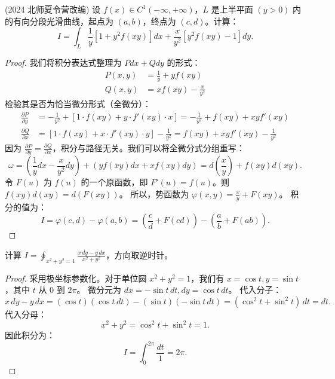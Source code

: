 \documentclass[lang=cn,10pt,thmcnt=section]{elegantbook}
\begin{document}
\begin{example}
    (2024 北师夏令营改编) 设 $f(x) \in C^1(-\infty, +\infty)$，$L$ 是上半平面 $(y > 0)$ 内的有向分段光滑曲线，起点为 $(a, b)$，终点为 $(c, d)$。计算：
\[
I = \int_{L} \frac{1}{y} [1 + y^2 f(xy)] dx + \frac{x}{y^2} [y^2 f(xy) - 1] dy.
\]
\end{example}
\begin{proof}
    我们将积分表达式整理为 $Pdx + Qdy$ 的形式：
    \begin{align*}
    P(x,y) &= \frac{1}{y} + y f(xy) \\
    Q(x,y) &= x f(xy) - \frac{x}{y^2}
    \end{align*}
    检验其是否为恰当微分形式（全微分）：
    \begin{align*}
    \frac{\partial P}{\partial y} &= -\frac{1}{y^2} + [1 \cdot f(xy) + y \cdot f'(xy) \cdot x] = -\frac{1}{y^2} + f(xy) + xy f'(xy) \\
    \frac{\partial Q}{\partial x} &= [1 \cdot f(xy) + x \cdot f'(xy) \cdot y] - \frac{1}{y^2} = f(xy) + xy f'(xy) - \frac{1}{y^2}
    \end{align*}
    因为 $\frac{\partial P}{\partial y} = \frac{\partial Q}{\partial x}$，积分与路径无关。我们可以将全微分式分组重写：
    \[
    \omega = \left( \frac{1}{y} dx - \frac{x}{y^2} dy \right) + \left( y f(xy) dx + x f(xy) dy \right) = d\left(\frac{x}{y}\right) + f(xy) d(xy).
    \]
    令 $F(u)$ 为 $f(u)$ 的一个原函数，即 $F'(u)=f(u)$。则 $f(xy)d(xy) = d(F(xy))$。
    所以，势函数为 $\varphi(x,y) = \frac{x}{y} + F(xy)$。
    积分的值为：
    \[
    I = \varphi(c, d) - \varphi(a, b) = \left(\frac{c}{d} + F(cd)\right) - \left(\frac{a}{b} + F(ab)\right).
    \]
\end{proof}


\begin{example}
    计算 $I = \oint_{x^2 + y^2 = 1} \frac{x \, dy - y \, dx}{x^2 + y^2}$，方向取逆时针。
\end{example}
\begin{proof}
    采用极坐标参数化。对于单位圆 $x^2+y^2=1$，我们有 $x = \cos t, y = \sin t$，其中 $t$ 从 $0$ 到 $2\pi$。
    微分元为 $dx = -\sin t \, dt, dy = \cos t \, dt$。
    代入分子：
    \[
    x \, dy - y \, dx = (\cos t)(\cos t \, dt) - (\sin t)(-\sin t \, dt) = (\cos^2 t + \sin^2 t) \, dt = dt.
    \]
    代入分母：
    \[
    x^2 + y^2 = \cos^2 t + \sin^2 t = 1.
    \]
    因此积分为：
    \[
    I = \int_0^{2\pi} \frac{dt}{1} = 2\pi.
    \]
\end{proof}
\end{document}
